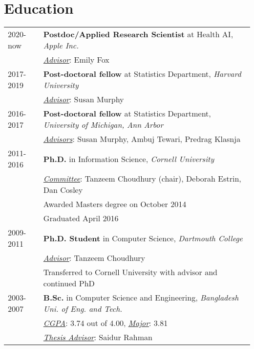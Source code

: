 \documentclass[10pt,fullpage]{article}
\begin{document}
\section*{\textbf{Education}}
\vspace{-1em}
\begin{longtable}{p{0.7in}|p{5.5in}}
		2020-now & {\bf Postdoc/Applied Research Scientist} at Health AI, {\it Apple Inc.} \\
			& \underline{{\it Advisor}}: Emily Fox\vspace{0.15cm}\\
		2017-2019 & {\bf Post-doctoral fellow} at Statistics Department, {\it Harvard University} \\
			& \underline{{\it Advisor}}: Susan Murphy\vspace{0.15cm}\\
	2016-2017 & {\bf Post-doctoral fellow} at Statistics Department, {\it University of Michigan, Ann Arbor} \\
			& \underline{{\it Advisors}}: Susan Murphy, Ambuj Tewari, Predrag Klasnja\vspace{0.15cm}\\	2011-2016 & {\bf Ph.D.} in Information Science, {\it Cornell University} \\
			& \underline{{\it Committee}}: Tanzeem Choudhury (chair), Deborah Estrin, Dan Cosley\\
			& Awarded Masters degree on October 2014 \\
			& Graduated April 2016\vspace{0.15cm}\\
	2009-2011& {\bf Ph.D. Student} in Computer Science, {\it Dartmouth College} \\
			& \underline{{\it Advisor}}: Tanzeem Choudhury \\
			&Transferred to Cornell University with advisor and continued PhD\vspace{0.15cm}\\
	2003-2007 & {\bf B.Sc.} in Computer Science and Engineering, {\it Bangladesh Uni. of Eng. and Tech.}\\
			& \underline{{\it CGPA}}: 3.74 out of 4.00, \underline{{\it Major}}: 3.81\\
			& \underline{{\it Thesis Advisor}}: Saidur Rahman\\
\end{longtable}
\end{document}
